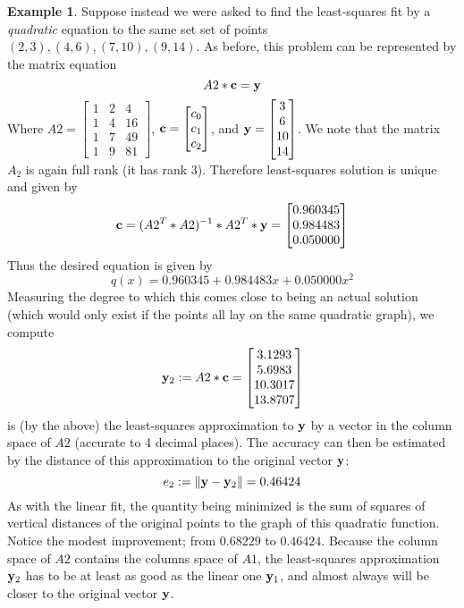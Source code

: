 \documentclass[11pt,notitlepage]{article}
\numberwithin{equation}{section}
\theoremstyle{plain}
\theoremstyle{definition}
\newtheorem{example}[equation]{Example}
\begin{document}
\begin{example} Suppose instead we were asked to find the least-squares fit by a {\it quadratic} equation to the same set set of points $(2,3), (4,6), (7,10), (9,14)$. As before, this problem can be represented by the matrix equation
\[
A2*{\bf c} = {\bf y}
\]
Where $A2 = \begin{bmatrix} 1 & 2 & 4\\1 & 4 & 16\\1 & 7 & 49\\1 & 9 & 81\end{bmatrix}$, ${\bf c} = \begin{bmatrix}c_0\\c_1\\c_2\end{bmatrix}$, and ${\bf y} = \begin{bmatrix} 3\\6\\10\\14\end{bmatrix}$. We note that the matrix $A_2$ is again full rank (it has rank 3). Therefore least-squares solution is unique and given by
\[
{\bf c} = (A2^T*A2)^{-1}*A2^T*{\bf y} = \begin{bmatrix} 0.960345\\ 0.984483\\0.050000\end{bmatrix}
\]
Thus the desired equation is given by
\[
q(x) = 0.960345 + 0.984483 x + 0.050000 x^2
\]
Measuring the degree to which this comes close to being an actual solution (which would only exist if the points all lay on the same quadratic graph), we compute
\[
{\bf y}_2 := A2*{\bf c} = \begin{bmatrix} 3.1293\\ 5.6983\\ 10.3017\\ 13.8707\end{bmatrix}
\]
is (by the above) the least-squares approximation to $\bf y$ by a vector in the column space of $A2$ (accurate to 4 decimal places). The accuracy can then be estimated by the distance of this approximation to the original vector $\bf y$:
\[
e_2 := \|{\bf y} - {\bf y}_2\| = 0.46424
\]
As with the linear fit, the quantity being minimized is the sum of squares of vertical distances of the original points to the graph of this quadratic function. Notice the modest improvement; from $0.68229$ to $0.46424$. Because the column space of $A2$ contains the columns space of $A1$, the least-squares approximation ${\bf y}_2$ has to be at least as good as the linear one ${\bf y}_1$, and almost always will be closer to the original vector $\bf y$.
\end{example}
\end{document}
